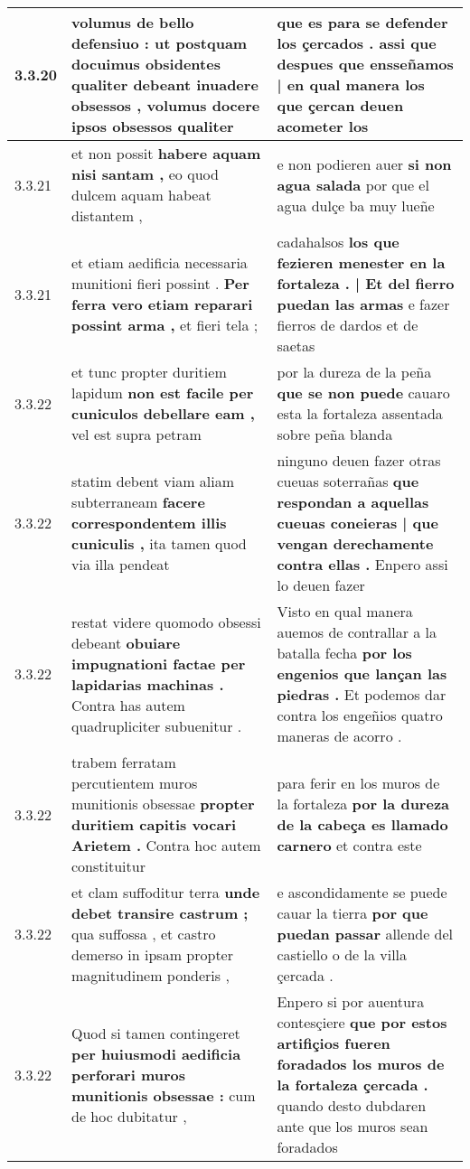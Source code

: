 \begin{tabular}{|p{1cm}|p{6.5cm}|p{6.5cm}|}
3.3.20 & volumus de bello defensiuo : \textbf{ ut postquam docuimus obsidentes qualiter debeant inuadere obsessos , } volumus docere ipsos obsessos qualiter & que es para se defender los çercados . \textbf{ assi que despues que ensseñamos | en qual manera } los que çercan deuen acometer los \\\hline
3.3.21 & et non possit \textbf{ habere aquam nisi santam , } eo quod dulcem aquam habeat distantem , & e non podieren auer \textbf{ si non agua salada } por que el agua dulçe ba muy lueñe \\\hline
3.3.21 & et etiam aedificia necessaria munitioni fieri possint . \textbf{ Per ferra vero etiam reparari possint arma , } et fieri tela ; & cadahalsos \textbf{ los que fezieren menester en la fortaleza . | Et del fierro puedan las armas } e fazer fierros de dardos et de saetas \\\hline
3.3.22 & et tunc propter duritiem lapidum \textbf{ non est facile per cuniculos debellare eam , } vel est supra petram & por la dureza de la peña \textbf{ que se non puede } cauaro esta la fortaleza assentada sobre peña blanda \\\hline
3.3.22 & statim debent viam aliam subterraneam \textbf{ facere correspondentem illis cuniculis , } ita tamen quod via illa pendeat & ninguno deuen fazer otras cueuas soterrañas \textbf{ que respondan a aquellas cueuas coneieras | que vengan derechamente contra ellas . } Enpero assi lo deuen fazer \\\hline
3.3.22 & restat videre quomodo obsessi debeant \textbf{ obuiare impugnationi factae per lapidarias machinas . } Contra has autem quadrupliciter subuenitur . & Visto en qual manera auemos de contrallar a la batalla fecha \textbf{ por los engenios que lançan las piedras . } Et podemos dar contra los engeñios quatro maneras de acorro . \\\hline
3.3.22 & trabem ferratam percutientem muros munitionis obsessae \textbf{ propter duritiem capitis vocari Arietem . } Contra hoc autem constituitur & para ferir en los muros de la fortaleza \textbf{ por la dureza de la cabeça es llamado carnero } et contra este \\\hline
3.3.22 & et clam suffoditur terra \textbf{ unde debet transire castrum ; } qua suffossa , et castro demerso in ipsam propter magnitudinem ponderis , & e ascondidamente se puede cauar la tierra \textbf{ por que puedan passar } allende del castiello o de la villa çercada . \\\hline
3.3.22 & Quod si tamen contingeret \textbf{ per huiusmodi aedificia perforari muros munitionis obsessae : } cum de hoc dubitatur , & Enpero si por auentura contesçiere \textbf{ que por estos artifiçios fueren foradados los muros de la fortaleza çercada . } quando desto dubdaren ante que los muros sean foradados \\\hline

\end{tabular}
